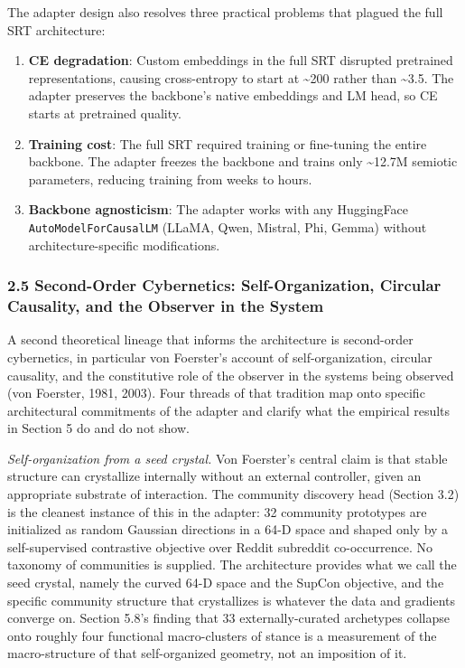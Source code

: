 \documentclass[
  11pt]{article}
\begin{document}
The adapter design also resolves three practical problems that plagued
the full SRT architecture:

\begin{enumerate}
\def\labelenumi{\arabic{enumi}.}
\item
  \textbf{CE degradation}: Custom embeddings in the full SRT disrupted
  pretrained representations, causing cross-entropy to start at
  \textasciitilde200 rather than \textasciitilde3.5. The adapter
  preserves the backbone's native embeddings and LM head, so CE starts
  at pretrained quality.
\item
  \textbf{Training cost}: The full SRT required training or fine-tuning
  the entire backbone. The adapter freezes the backbone and trains only
  \textasciitilde12.7M semiotic parameters, reducing training from weeks
  to hours.
\item
  \textbf{Backbone agnosticism}: The adapter works with any HuggingFace
  \texttt{AutoModelForCausalLM} (LLaMA, Qwen, Mistral, Phi, Gemma)
  without architecture-specific modifications.
\end{enumerate}

\subsubsection{2.5 Second-Order Cybernetics: Self-Organization, Circular
Causality, and the Observer in the
System}\label{second-order-cybernetics-self-organization-circular-causality-and-the-observer-in-the-system}

A second theoretical lineage that informs the architecture is
second-order cybernetics, in particular von Foerster's account of
self-organization, circular causality, and the constitutive role of the
observer in the systems being observed (von Foerster, 1981, 2003). Four
threads of that tradition map onto specific architectural commitments of
the adapter and clarify what the empirical results in Section 5 do and
do not show.

\emph{Self-organization from a seed crystal.} Von Foerster's central
claim is that stable structure can crystallize internally without an
external controller, given an appropriate substrate of interaction. The
community discovery head (Section 3.2) is the cleanest instance of this
in the adapter: 32 community prototypes are initialized as random
Gaussian directions in a 64-D space and shaped only by a self-supervised
contrastive objective over Reddit subreddit co-occurrence. No taxonomy
of communities is supplied. The architecture provides what we call the
seed crystal, namely the curved 64-D space and the SupCon objective, and
the specific community structure that crystallizes is whatever the data
and gradients converge on. Section 5.8's finding that 33
externally-curated archetypes collapse onto roughly four functional
macro-clusters of stance is a measurement of the macro-structure of that
self-organized geometry, not an imposition of it.
\end{document}
